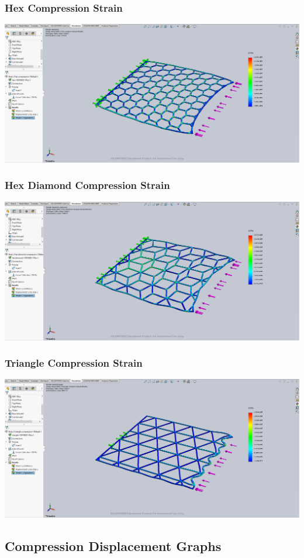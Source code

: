 \documentclass[12pt, letterpaper]{article}
\begin{document}
\begin{singlespace}
\subsubsection{Hex Compression Strain}
\label{ap:h-c-es}
\includegraphics[width=0.8\linewidth]{./graphs/compression/hex-compression-strain}

\subsubsection{Hex Diamond Compression Strain}
\label{ap:hd-c-es}
\includegraphics[width=0.8\linewidth]{./graphs/compression/hex-diamond-compression-strain}

\subsubsection{Triangle Compression Strain}
\label{ap:t-c-es}
\includegraphics[width=0.8\linewidth]{./graphs/compression/triangle-compression-strain}


\subsection{Compression Displacement Graphs}
\label{ap:c-d}


\end{singlespace}
\end{document}
